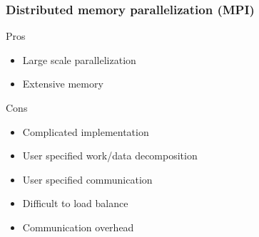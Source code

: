 \documentclass[mathserif]{beamer}
\begin{document}
\begin{frame}
    \frametitle{Distributed memory parallelization (MPI)}
    \begin{minipage}[b]{0.45\linewidth}
	Pros
	\begin{itemize}
	    \item Large scale parallelization
	    \item Extensive memory
	\end{itemize}
	Cons
	\begin{itemize}
	    \item Complicated implementation
	    \item User specified work/data decomposition 
	    \item User specified communication
	    \item Difficult to load balance
	    \item Communication overhead
	\end{itemize}
    \end{minipage}
    \hfill
    \begin{minipage}[b]{0.4\linewidth}
\end{minipage}
\end{frame}
\end{document}
